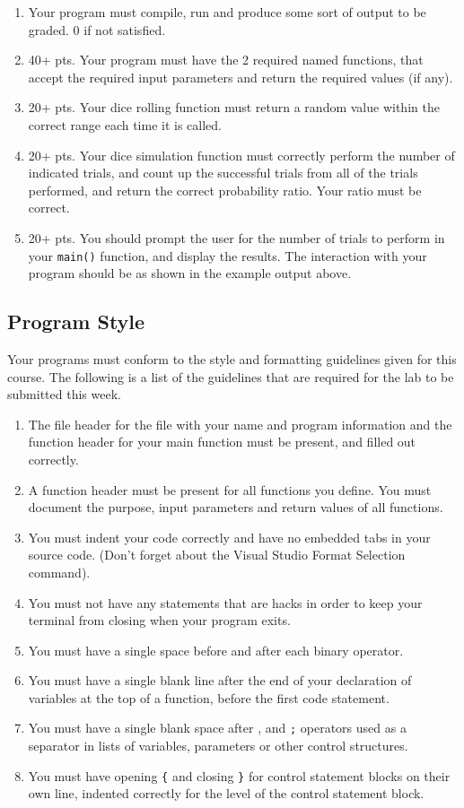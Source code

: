 \documentclass[11pt]{article}
\begin{document}
\begin{enumerate}
\item Your program must compile, run and produce some sort of output to be
  graded. 0 if not satisfied.
\item 40+ pts.  Your program must have the 2 required named functions,
   that accept the required input parameters and return the required
   values (if any).
\item 20+ pts. Your dice rolling function must return a random value within the
   correct range each time it is called.
\item 20+ pts. Your dice simulation function must correctly perform the number of indicated
   trials, and count up the successful trials from all of the trials performed,
   and return the correct probability ratio.  Your ratio must be correct.
\item 20+ pts. You should prompt the user for the number of trials to
   perform in your \verb~main()~ function, and display the results.  The
   interaction with your program should be as shown in the example
   output above.
\end{enumerate}
\subsection*{Program Style}
\label{sec-5-2}


Your programs must conform to the style and formatting guidelines given for this course.
The following is a list of the guidelines that are required for the lab to be submitted
this week.

\begin{enumerate}
\item The file header for the file with your name and program information
  and the function header for your main function must be present, and
  filled out correctly.
\item A function header must be present for all functions you define.
  You must document the purpose, input parameters and return values
  of all functions.
\item You must indent your code correctly and have no embedded tabs in
  your source code. (Don't forget about the Visual Studio Format
  Selection command).
\item You must not have any statements that are hacks in order to keep
  your terminal from closing when your program exits.
\item You must have a single space before and after each binary operator.
\item You must have a single blank line after the end of your declaration
  of variables at the top of a function, before the first code
  statement.
\item You must have a single blank space after , and \verb~;~ operators used as a
  separator in lists of variables, parameters or other control
  structures.
\item You must have opening \verb~{~ and closing \verb~}~ for control statement blocks
  on their own line, indented correctly for the level of the control
  statement block.
\end{enumerate}
\end{document}
